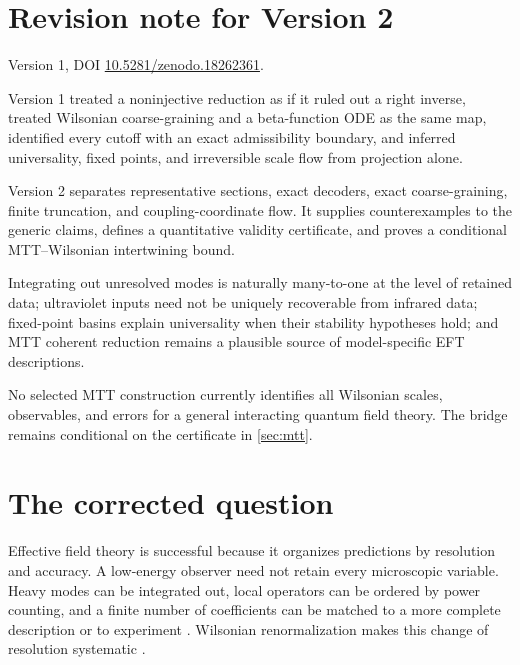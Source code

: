 \documentclass[11pt]{article}
\theoremstyle{definition}
\theoremstyle{remark}
\begin{document}
\section*{Revision note for Version 2}
\begin{description}[leftmargin=3.3cm,style=nextline]
\item[Supersedes.] Version 1, DOI
\href{https://doi.org/10.5281/zenodo.18262361}{10.5281/zenodo.18262361}.

\item[Reason.] Version 1 treated a noninjective reduction as if it ruled out
a right inverse, treated Wilsonian coarse-graining and a beta-function ODE as
the same map, identified every cutoff with an exact admissibility boundary,
and inferred universality, fixed points, and irreversible scale flow from
projection alone.

\item[Resolution.] Version 2 separates representative sections, exact
decoders, exact coarse-graining, finite truncation, and coupling-coordinate
flow.  It supplies counterexamples to the generic claims, defines a
quantitative validity certificate, and proves a conditional MTT--Wilsonian
intertwining bound.

\item[Retained content.] Integrating out unresolved modes is naturally
many-to-one at the level of retained data; ultraviolet inputs need not be
uniquely recoverable from infrared data; fixed-point basins explain
universality when their stability hypotheses hold; and MTT coherent
reduction remains a plausible source of model-specific EFT descriptions.

\item[Remaining boundary.] No selected MTT construction currently identifies
all Wilsonian scales, observables, and errors for a general interacting
quantum field theory.  The bridge remains conditional on the certificate in
\cref{sec:mtt}.
\end{description}

\tableofcontents

\section{The corrected question}

Effective field theory is successful because it organizes predictions by
resolution and accuracy.  A low-energy observer need not retain every
microscopic variable.  Heavy modes can be integrated out, local operators can
be ordered by power counting, and a finite number of coefficients can be
matched to a more complete description or to experiment
\cite{Weinberg1979,Georgi1993,Burgess2007}.  Wilsonian renormalization makes
this change of resolution systematic
\cite{Kadanoff1966,Wilson1971,WilsonKogut1974,Wilson1975}.
\end{document}
